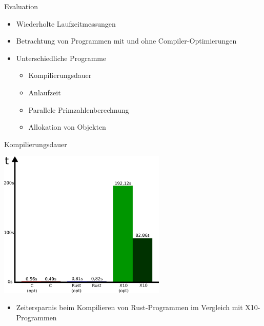 \begin{frame}{Evaluation}
    \begin{itemize}
      \item Wiederholte Laufzeitmessungen
      \item Betrachtung von Programmen mit und ohne Compiler-Optimierungen
      \item Unterschiedliche Programme
        \begin{itemize}
          \item Kompilierungsdauer
          \item Anlaufzeit
          \item Parallele Primzahlenberechnung
          \item Allokation von Objekten
        \end{itemize}
    \end{itemize}
\end{frame}

\begin{frame}{Kompilierungsdauer}
  \begin{center}
    \includegraphics[width=0.6\textwidth]{images/compile-eval.pdf}
  \end{center}
  \begin{itemize}
    \item Zeitersparnis beim Kompilieren von Rust-Programmen im Vergleich mit X10-Programmen
  \end{itemize}
\end{frame}

